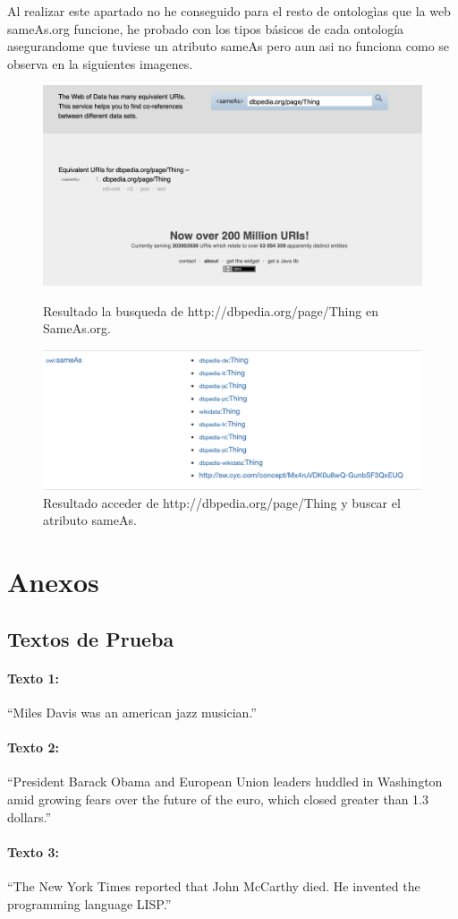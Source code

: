\documentclass[spanish]{llncs}   %
\begin{document}
Al realizar este apartado no he conseguido para el resto de ontologìas que la web sameAs.org funcione, he probado con los tipos 
básicos de cada ontología asegurandome que tuviese un atributo sameAs pero aun asi no funciona como se observa en la siguientes imagenes.

\begin{figure}[!htb]
    \includegraphics[width=\textwidth]{resources/SameAsWeb.png}
    \caption{Resultado la busqueda de http://dbpedia.org/page/Thing en SameAs.org.}
    \label{Fig.2}
    \includegraphics[width=\textwidth]{resources/DBPediaSameAs.png}
    \caption{Resultado acceder de http://dbpedia.org/page/Thing y buscar el atributo sameAs.}
    \label{Fig.3}
\end{figure}

\section{Anexos}

\subsection{Textos de Prueba}\label{Textos}

\paragraph{Texto 1:}
“Miles Davis was an american jazz musician.”

\paragraph{Texto 2:}
“President Barack Obama and European Union leaders huddled in Washington amid growing fears over the future of the euro, which closed greater than 1.3 dollars.”

\paragraph{Texto 3:}
“The New York Times reported that John McCarthy died. He invented the programming language LISP.”
\end{document}
